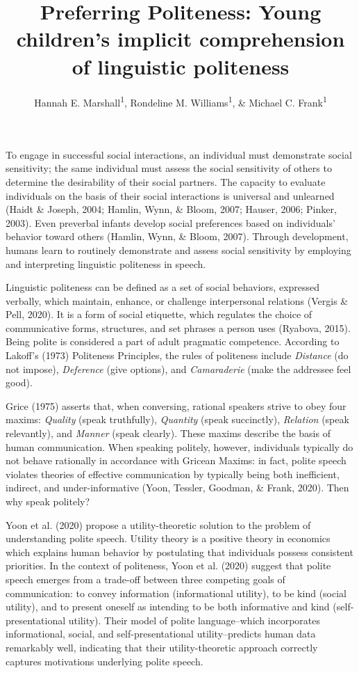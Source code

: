 \documentclass[
  english,
  man,floatsintext]{apa6}
\title{Preferring Politeness: Young children's implicit comprehension of linguistic politeness}
\author{Hannah E. Marshall\textsuperscript{1}, Rondeline M. Williams\textsuperscript{1}, \& Michael C. Frank\textsuperscript{1}}
\date{}
\affiliation{\vspace{0.5cm}\textsuperscript{1} Stanford University}
\begin{document}
\maketitle

To engage in successful social interactions, an individual must demonstrate social sensitivity; the same individual must assess the social sensitivity of others to determine the desirability of their social partners. The capacity to evaluate individuals on the basis of their social interactions is universal and unlearned (Haidt \& Joseph, 2004; Hamlin, Wynn, \& Bloom, 2007; Hauser, 2006; Pinker, 2003). Even preverbal infants develop social preferences based on individuals' behavior toward others (Hamlin, Wynn, \& Bloom, 2007). Through development, humans learn to routinely demonstrate and assess social sensitivity by employing and interpreting linguistic politeness in speech.

Linguistic politeness can be defined as a set of social behaviors, expressed verbally, which maintain, enhance, or challenge interpersonal relations (Vergis \& Pell, 2020). It is a form of social etiquette, which regulates the choice of communicative forms, structures, and set phrases a person uses (Ryabova, 2015). Being polite is considered a part of adult pragmatic competence. According to Lakoff's (1973) Politeness Principles, the rules of politeness include \emph{Distance} (do not impose), \emph{Deference} (give options), and \emph{Camaraderie} (make the addressee feel good).

Grice (1975) asserts that, when conversing, rational speakers strive to obey four maxims: \emph{Quality} (speak truthfully), \emph{Quantity} (speak succinctly), \emph{Relation} (speak relevantly), and \emph{Manner} (speak clearly). These maxims describe the basis of human communication. When speaking politely, however, individuals typically do not behave rationally in accordance with Gricean Maxims: in fact, polite speech violates theories of effective communication by typically being both inefficient, indirect, and under-informative (Yoon, Tessler, Goodman, \& Frank, 2020). Then why speak politely?

Yoon et al. (2020) propose a utility-theoretic solution to the problem of understanding polite speech. Utility theory is a positive theory in economics which explains human behavior by postulating that individuals possess consistent priorities. In the context of politeness, Yoon et al. (2020) suggest that polite speech emerges from a trade-off between three competing goals of communication: to convey information (informational utility), to be kind (social utility), and to present oneself as intending to be both informative and kind (self-presentational utility). Their model of polite language--which incorporates informational, social, and self-presentational utility--predicts human data remarkably well, indicating that their utility-theoretic approach correctly captures motivations underlying polite speech.
\end{document}
